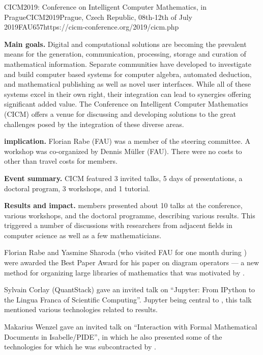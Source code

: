 \begin{event}{CICM2019: Conference on Intelligent Computer Mathematics, in Prague}{CICM2019}{Prague, Czech Republic, 08th-12th of July 2019}{FAU}{65}{7}{https://cicm-conference.org/2019/cicm.php}

\textbf{Main goals.}
Digital and computational solutions are becoming the prevalent means for the generation, communication, processing, storage and curation of mathematical information.
Separate communities have developed to investigate and build computer based systems for computer algebra, automated deduction, and mathematical publishing as well as novel user interfaces.
While all of these systems excel in their own right, their integration can lead to synergies offering significant added value.
The Conference on Intelligent Computer Mathematics (CICM) offers a venue for discussing and developing solutions to the great challenges posed by the integration of these diverse areas.

\textbf{\ODK implication.}
Florian Rabe (FAU) was a member of the steering committee.
A workshop was co-organized by Dennis M\"uller (FAU).
There were no costs to \ODK other than travel costs for \ODK members.

\textbf{Event summary.}
CICM featured 3 invited talks, 5 days of presentations, a doctoral program, 3 workshops, and 1 tutorial.

\textbf{Results and impact.}
\ODK members presented about 10 talks at the conference, various workshops, and the doctoral programme, describing various \ODK results.
This triggered a number of discussions with researchers from adjacent fields in computer science as well as a few mathematicians.

Florian Rabe and Yasmine Sharoda (who visited FAU for one month during \ODK) were awarded the Best Paper Award for his paper on diagram operators --- a new method for organizing large libraries of mathematics that was motivated by \ODK.

Sylvain Corlay (QuantStack) gave an invited talk on ``Jupyter: From IPython to the Lingua Franca of Scientific Computing''.
Jupyter being central to \ODK, this talk mentioned various technologies related to \ODK results.

Makarius Wenzel gave an invited talk on ``Interaction with Formal Mathematical Documents in Isabelle/PIDE'', in which he also presented some of the technologies for which he was subcontracted by \ODK.
\end{event}
